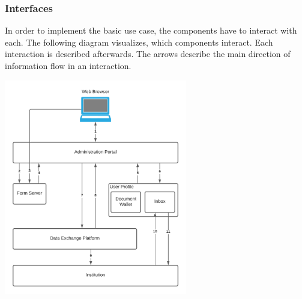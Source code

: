 \subsubsection{Interfaces}
In order to implement the basic use case, the components have to interact with each. The following diagram visualizes, which components interact. Each interaction is described afterwards. The arrows describe the main direction of information flow in an interaction.

\begin{center}
    \includegraphics[width=8cm]{Diagrams/Interaction Diagram.png}
\end{center}

